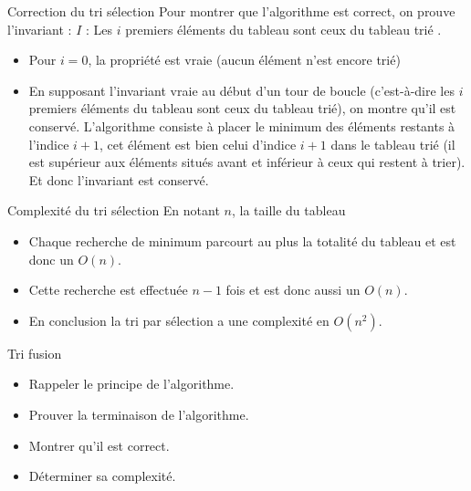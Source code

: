 \documentclass[10pt]{beamer}
\begin{document}
\begin{frame}[fragile]{\Ctitle}{\stitle}
	\begin{exampleblock}{Correction du tri sélection}
		\textcolor{OliveGreen}{Pour montrer que l'algorithme est correct, on prouve  l'invariant : $I$ : \og{}  Les $i$ premiers éléments du tableau sont ceux du tableau trié \fg{}.}
		\begin{itemize}
			\item<2->\textcolor{OliveGreen}{Pour $i=0$, la propriété est vraie (aucun élément n'est encore trié)}
			\item<3->\textcolor{OliveGreen}{En supposant l'invariant vraie au début d'un tour de boucle (c'est-à-dire les $i$ premiers éléments du tableau sont ceux du tableau trié), on montre qu'il est conservé. L'algorithme consiste à placer le minimum des éléments restants à l'indice $i+1$, cet élément est bien celui d'indice $i+1$ dans le tableau trié (il est supérieur aux éléments situés avant et inférieur à ceux qui restent à trier). Et donc l'invariant est conservé.}
		\end{itemize}
	\end{exampleblock}
\end{frame}

\begin{frame}[fragile]{\Ctitle}{\stitle}
	\begin{exampleblock}{Complexité du tri sélection}
		En notant $n$, la taille du tableau
		\begin{itemize}
			\item<1-> Chaque recherche de minimum parcourt au plus la totalité du tableau et est donc un $O(n)$.
			\item<2-> Cette recherche est effectuée $n-1$ fois et est donc aussi un $O(n)$.
			\item<3-> En conclusion la tri par sélection a une complexité en $O(n^2)$.
		\end{itemize}
	\end{exampleblock}
\end{frame}

\begin{frame}[fragile]{\Ctitle}{\stitle}
	\begin{exampleblock}{Tri fusion}
		\begin{itemize}
			\item<1-> Rappeler le principe de l'algorithme.
			\item<2-> Prouver la terminaison de l'algorithme.
			\item<3-> Montrer qu'il est correct.
			\item<4-> Déterminer sa complexité.
		\end{itemize}
	\end{exampleblock}
\end{frame}
\end{document}
